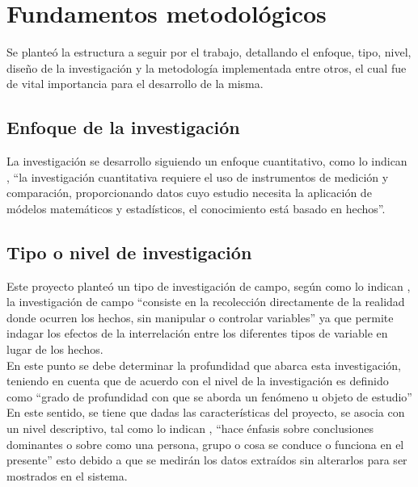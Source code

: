 \chapter{Fundamentos metodol\'ogicos}

	Se plante\'o la estructura a seguir por el trabajo, detallando el enfoque, tipo, nivel, dise\~no de la investigaci\'on y la metodolog\'ia implementada entre otros, el cual fue de vital importancia para el desarrollo de la misma. 
	
\section{Enfoque de la investigaci\'on}
	
	La investigaci\'on se desarrollo siguiendo un enfoque cuantitativo, como lo indican  \citet{pallela}, “la investigaci\'on cuantitativa requiere el uso de instrumentos de medici\'on y comparaci\'on, proporcionando datos cuyo estudio necesita la aplicaci\'on de m\'odelos matem\'aticos y estad\'isticos, el conocimiento est\'a basado en hechos”.  

\section{Tipo o nivel de investigaci\'on}
	
	Este proyecto plante\'o un tipo de investigaci\'on de campo, seg\'un como lo indican \citet{pallela},  la investigaci\'on de campo “consiste en la recolecci\'on directamente de la realidad donde ocurren los hechos, sin manipular o controlar variables” ya que permite indagar los efectos de la interrelaci\'on entre los diferentes tipos de variable en lugar de los hechos.\\

	En este punto se debe determinar la profundidad que abarca esta investigaci\'on, teniendo en cuenta que de acuerdo con \citet{arias} el nivel de la investigaci\'on es definido como “grado de profundidad con que se aborda un fen\'omeno u objeto de estudio”\\

	En este sentido, se tiene que dadas las caracter\'isticas del proyecto, se asocia con un nivel descriptivo, tal como lo indican \citet{pallela},  “hace \'enfasis sobre conclusiones dominantes o sobre como una persona, grupo o cosa se conduce o funciona en el presente” esto debido a que se medir\'an los datos extra\'idos sin alterarlos para ser mostrados en el sistema.\\

